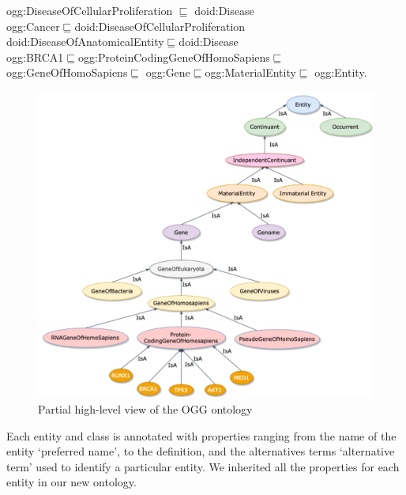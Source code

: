\vspace{-4mm}
{\scriptsize
    \hspace{-1mm} \noindent ogg:DiseaseOfCellularProliferation $\sqsubseteq$ doid:Disease\\
    \hspace{2mm} ogg:Cancer$\sqsubseteq$doid:DiseaseOfCellularProliferation\\
    \hspace{2mm} doid:DiseaseOfAnatomicalEntity$\sqsubseteq$doid:Disease\\
    \hspace{2mm} ogg:BRCA1$\sqsubseteq$ogg:ProteinCodingGeneOfHomoSapiens$\sqsubseteq$ogg:GeneOfHomoSapiens$\sqsubseteq$ ogg:Gene$\sqsubseteq$ogg:MaterialEntity$\sqsubseteq$ ogg:Entity.}\\

\vspace{-2mm}
\begin{figure}
	\centering
	\includegraphics[scale=0.5]{images/go.png}
	\caption{Partial high-level view of the OGG ontology} 
	\label{fig:ogg_ontology}
	\vspace{-2mm}
\end{figure}

\vspace{-2mm}
\hspace*{3.5mm} Each entity and class is annotated with properties ranging from the name of the entity `preferred name', to the definition, and the alternatives terms `alternative term' used to identify a particular entity. We inherited all the properties for each entity in our new ontology.

